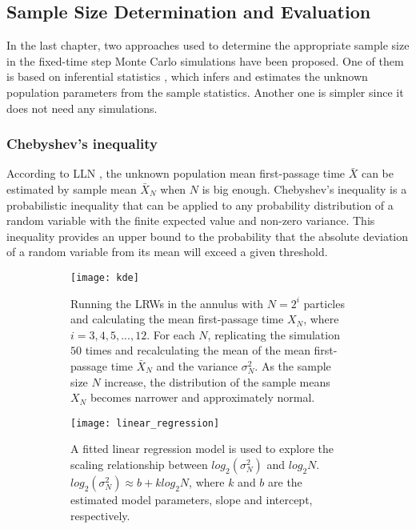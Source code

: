 

\subsection{Sample Size Determination and Evaluation}

In the last chapter, two approaches used to determine the appropriate
sample size in the fixed-time step Monte Carlo simulations have been
proposed. One of them is based on inferential statistics
\cite{casella2002statistical}, which infers and estimates the unknown
population parameters from the sample statistics. Another one is
simpler since it does not need any simulations.

\subsubsection{Chebyshev's inequality}

According to LLN \cite{dekking2005modern}, the unknown population mean
first-passage time $\bar X$ can be estimated by sample mean $\bar X_N$
when $N$ is big enough. Chebyshev’s inequality
\cite{chebyshev1867valeurs} is a probabilistic inequality that can be
applied to any probability distribution of a random variable with the
finite expected value and non-zero variance. This inequality provides
an upper bound to the probability that the absolute deviation of a
random variable from its mean will exceed a given threshold.

\begin{figure}
  \begin{subfigure}{0.9\textwidth}
    \centering
    \texttt{[image: kde]}
    \caption{Running the LRWs in the annulus with $N = 2^i$
      particles and calculating the mean first-passage time $X_N$, where
      $i=3, 4, 5, ..., 12$. For each $N$, replicating the simulation
      $50$ times and recalculating the mean of the mean first-passage
      time $\bar X_{N}$ and the variance $\sigma^2_{N}$. As the sample
      size $N$ increase, the distribution of the sample means $X_N$
      becomes narrower and approximately normal. \label{fig:annulus_kde}}
  \end{subfigure}
  \begin{subfigure}{0.9\textwidth}
    \centering
    \texttt{[image: linear\_regression]}
    \caption{A fitted linear regression model is used to explore the
      scaling relationship between $log_{2} (\sigma^2_{N})$ and
      $log_{2} N$. $log_{2} (\sigma^2_{N}) \approx b + k log_{2} N$,
      where $k$ and $b$ are the estimated model parameters, slope and
      intercept, respectively.\label{fig:annulus_linear_regression}}
  \end{subfigure}
  \caption{\label{fig:annulus_cheb}}
\end{figure}


